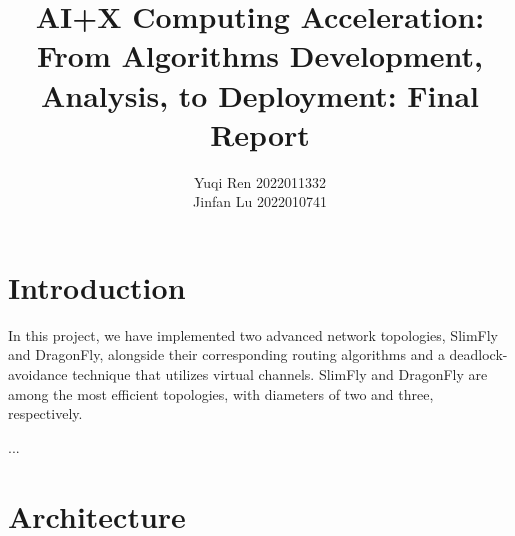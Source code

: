 \documentclass[utf8]{article}
\title{\bf\LARGE AI+X Computing Acceleration: From Algorithms Development, Analysis, to Deployment: Final Report}
\author{Yuqi Ren 2022011332 \\ Jinfan Lu 2022010741}
\date{}
\begin{document}
\maketitle
\thispagestyle{empty}

\section{Introduction}

In this project, we have implemented two advanced network topologies, SlimFly and DragonFly, alongside their corresponding routing algorithms and a deadlock-avoidance technique that utilizes virtual channels. SlimFly and DragonFly are among the most efficient topologies, with diameters of two and three, respectively.

...

\section{Architecture}
\end{document}
